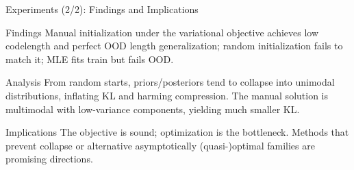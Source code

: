 \documentclass{beamer}
\begin{document}
\begin{frame}{Experiments (2/2): Findings and Implications}
\small
\begin{block}{Findings}
Manual initialization under the variational objective achieves low codelength and perfect OOD length generalization; random initialization fails to match it; MLE fits train but fails OOD.
\end{block}

\begin{block}{Analysis}
From random starts, priors/posteriors tend to collapse into unimodal distributions, inflating KL and harming compression. The manual solution is multimodal with low-variance components, yielding much smaller KL.
\end{block}

\begin{block}{Implications}
The objective is sound; optimization is the bottleneck. Methods that prevent collapse or alternative asymptotically (quasi-)optimal families are promising directions.
\end{block}
\end{frame}
\end{document}
